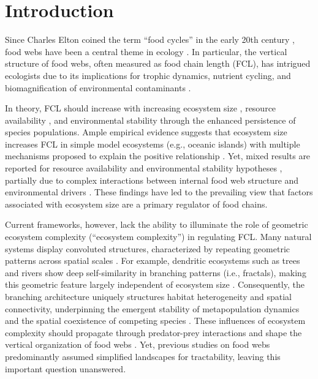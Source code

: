 \documentclass[11pt, class=article, crop=false]{standalone}
\begin{document}
\newpage

\section{Introduction}
Since Charles Elton coined the term ``food cycles'' in the early 20th century \citep{elton_animal_1927}, food webs have been a central theme in ecology \citep{paine_food_1966, pimm_food_1991, post_long_2002}.
In particular, the vertical structure of food webs, often measured as food chain length (FCL), has intrigued ecologists due to its implications for trophic dynamics, nutrient cycling, and biomagnification of environmental contaminants \citep{post_long_2002}.

In theory, FCL should increase with increasing ecosystem size \citep{schoener_food_1989}, resource availability \citep{oksanen_exploitation_1981}, and environmental stability \citep{pimm_number_1977} through the enhanced persistence of species populations.
Ample empirical evidence suggests that ecosystem size increases FCL in simple model ecosystems (e.g., oceanic islands) \citep{vander_zanden_patterns_1999, post_ecosystem_2000, takimoto_ecosystem_2008, doi_resource_2009} with multiple mechanisms proposed to explain the positive relationship \citep{takimoto_effects_2012, ward_mechanistic_2017, mcintosh_capacity_2018, terui_spatial_2019}.
Yet, mixed results are reported for resource availability and environmental stability hypotheses \citep{takimoto_environmental_2013, warfe_productivity_2013, guo_towards_2023}, partially due to complex interactions between internal food web structure and environmental drivers \citep{takimoto_effects_2012, shibasaki_food_2024}.
These findings have led to the prevailing view that factors associated with ecosystem size are a primary regulator of food chains.

Current frameworks, however, lack the ability to illuminate the role of geometric ecosystem complexity (``ecosystem complexity'') in regulating FCL.
Many natural systems display convoluted structures, characterized by repeating geometric patterns across spatial scales \citep{rodriguez-iturbe_fractal_2001, turner_landscape_2015}.
For example, dendritic ecosystems such as trees and rivers show deep self-similarity in branching patterns (i.e., fractals), making this geometric feature largely independent of ecosystem size \citep{terui_metapopulation_2018, terui_emergent_2021, rodriguez-iturbe_fractal_2001, terui_revisiting_2024}.
Consequently, the branching architecture uniquely structures habitat heterogeneity and spatial connectivity, underpinning the emergent stability of metapopulation dynamics \citep{yeakel_synchronisation_2014, moore_emergent_2015, terui_metapopulation_2018} and the spatial coexistence of competing species  \citep{terui_emergent_2021}.
These influences of ecosystem complexity should propagate through predator-prey interactions and shape the vertical organization of food webs \citep{pomeranz_ecosystem_2023}.
Yet, previous studies on food webs predominantly assumed simplified landscapes for tractability, leaving this important question unanswered.
\end{document}
